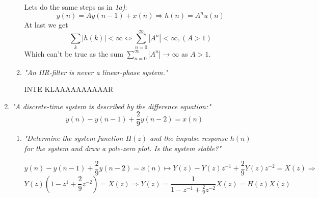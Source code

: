 \documentclass{article}
\begin{document}
\begin{enumerate}
\begin{enumerate}
                Lets do the same steps as in \emph{1a)}:
                $$
                   y(n) = Ay(n-1) + x(n) \Rightarrow h(n) = A^nu(n)
                $$
                At last we get
                $$
                  \sum_k |h(k)| < \infty \Leftrightarrow \sum_{n=0}^{\infty}|A^n| < \infty,  (A > 1)
                $$
                Which can't be true as the sum $\sum_{n=0}^{\infty}|A^n|
\rightarrow \infty$ as $A>1$.
                
            \item %
                \emph{"An IIR-filter is never a linear-phase system."}
                
                {\Large \centering INTE KLAAAAAAAAAAR}
                
                
        \end{enumerate} %
    \item %
        \emph{"A discrete-time system is described by the difference equation:"}
        $$
            y(n)-y(n-1) + \frac{2}{9}y(n-2) = x(n)
        $$
        \begin{enumerate}
            \item %
                \emph{"Determine the system function $H(z)$ and the impulse response $h(n)$ for the system and draw a pole-zero plot. Is the system stable?"}
                
                $$
                    y(n)-y(n-1) + \frac{2}{9}y(n-2) = x(n) \longmapsto 
                    Y(z) - Y(z)z^{-1} + \frac{2}{9} Y(z)z^{-2} = X(z) \Rightarrow
                $$ $$
                    Y(z)(1 - z^{1} + \frac{2}{9} z^{-2}) = X(z) \Rightarrow
                    Y(z) = \frac{1}{1 - z^{-1} + \frac{2}{9}z^{-2}} X(z) = H(z)X(z)
                $$
                

\end{enumerate}
\end{enumerate}
\end{document}
